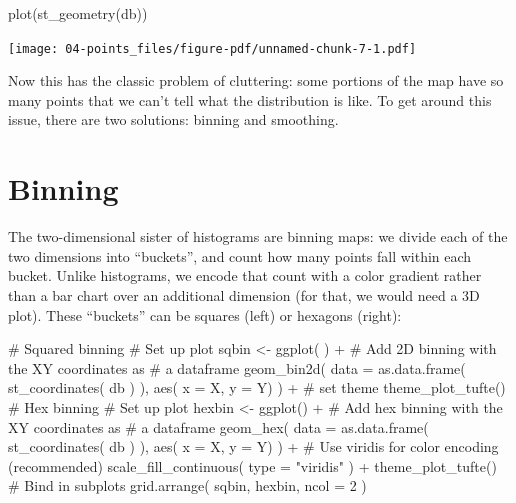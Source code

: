 \documentclass[
  letterpaper,
  DIV=11,
  numbers=noendperiod,
  oneside]{scrreprt}
\newenvironment{Shaded}{\begin{snugshade}}{\end{snugshade}}
\newcommand{\AttributeTok}[1]{\textcolor[rgb]{0.40,0.45,0.13}{#1}}
\newcommand{\CommentTok}[1]{\textcolor[rgb]{0.37,0.37,0.37}{#1}}
\newcommand{\DecValTok}[1]{\textcolor[rgb]{0.68,0.00,0.00}{#1}}
\newcommand{\FunctionTok}[1]{\textcolor[rgb]{0.28,0.35,0.67}{#1}}
\newcommand{\NormalTok}[1]{\textcolor[rgb]{0.00,0.23,0.31}{#1}}
\newcommand{\OtherTok}[1]{\textcolor[rgb]{0.00,0.23,0.31}{#1}}
\newcommand{\SpecialCharTok}[1]{\textcolor[rgb]{0.37,0.37,0.37}{#1}}
\newcommand{\StringTok}[1]{\textcolor[rgb]{0.13,0.47,0.30}{#1}}
\begin{document}
\begin{Shaded}
\begin{Highlighting}[]
\FunctionTok{plot}\NormalTok{(}\FunctionTok{st\_geometry}\NormalTok{(db))}
\end{Highlighting}
\end{Shaded}

\texttt{[image: 04-points\_files/figure-pdf/unnamed-chunk-7-1.pdf]}

Now this has the classic problem of cluttering: some portions of the map
have so many points that we can't tell what the distribution is like. To
get around this issue, there are two solutions: binning and smoothing.

\section{Binning}\label{binning}

The two-dimensional sister of histograms are binning maps: we divide
each of the two dimensions into ``buckets'', and count how many points
fall within each bucket. Unlike histograms, we encode that count with a
color gradient rather than a bar chart over an additional dimension (for
that, we would need a 3D plot). These ``buckets'' can be squares (left)
or hexagons (right):

\begin{Shaded}
\begin{Highlighting}[]
      \CommentTok{\# Squared binning}
\CommentTok{\# Set up plot}
\NormalTok{sqbin }\OtherTok{\textless{}{-}} \FunctionTok{ggplot}\NormalTok{( ) }\SpecialCharTok{+} 
\CommentTok{\# Add 2D binning with the XY coordinates as}
\CommentTok{\# a dataframe}
  \FunctionTok{geom\_bin2d}\NormalTok{(}
    \AttributeTok{data =} \FunctionTok{as.data.frame}\NormalTok{( }\FunctionTok{st\_coordinates}\NormalTok{( db ) ), }
    \FunctionTok{aes}\NormalTok{( }\AttributeTok{x =}\NormalTok{ X, }\AttributeTok{y =}\NormalTok{ Y)}
\NormalTok{  ) }\SpecialCharTok{+} 
  \CommentTok{\# set theme }
  \FunctionTok{theme\_plot\_tufte}\NormalTok{()}
      \CommentTok{\# Hex binning}
\CommentTok{\# Set up plot}
\NormalTok{hexbin }\OtherTok{\textless{}{-}} \FunctionTok{ggplot}\NormalTok{() }\SpecialCharTok{+}
\CommentTok{\# Add hex binning with the XY coordinates as}
\CommentTok{\# a dataframe }
  \FunctionTok{geom\_hex}\NormalTok{(}
    \AttributeTok{data =} \FunctionTok{as.data.frame}\NormalTok{( }\FunctionTok{st\_coordinates}\NormalTok{( db ) ),}
    \FunctionTok{aes}\NormalTok{( }\AttributeTok{x =}\NormalTok{ X, }\AttributeTok{y =}\NormalTok{ Y)}
\NormalTok{  ) }\SpecialCharTok{+}
\CommentTok{\# Use viridis for color encoding (recommended)}
  \FunctionTok{scale\_fill\_continuous}\NormalTok{( }\AttributeTok{type =} \StringTok{"viridis"}\NormalTok{ ) }\SpecialCharTok{+}
  \FunctionTok{theme\_plot\_tufte}\NormalTok{()}
      \CommentTok{\# Bind in subplots}
\FunctionTok{grid.arrange}\NormalTok{( sqbin, hexbin, }\AttributeTok{ncol =} \DecValTok{2}\NormalTok{ ) }
\end{Highlighting}
\end{Shaded}
\end{document}
